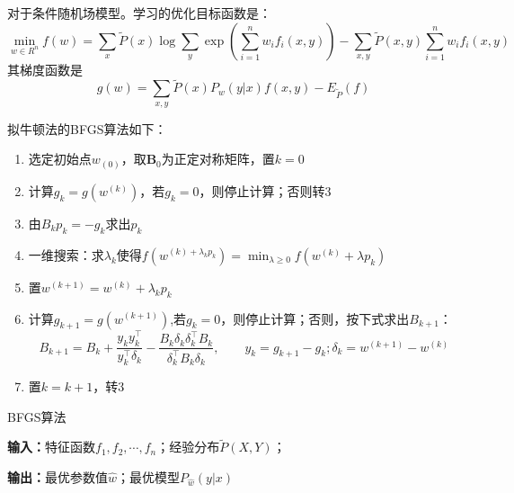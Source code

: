 \documentclass[a4paper,UTF8,no-math]{ctexart}
\begin{document}
	    对于条件随机场模型。学习的优化目标函数是：\begin{equation}
	    	\min_{w\in R^{n}} f(w)=\sum_{x}\tilde{P}(x)\log \sum_{y}\exp\left(\sum_{i=1}^{n}w_{i}f_{i}\left(x,y\right)\right)-\sum_{x,y}\tilde{P}(x,y)\sum_{i=1}^{n}w_{i}f_{i}\left(x,y\right) 
	    \end{equation}其梯度函数是\begin{equation}
	    	g(w)=\sum_{x,y}\tilde{P}(x)P_{w}(y|x)f(x,y)-E_{\tilde{P}}(f)
	    \end{equation}
	    
	    拟牛顿法的BFGS算法如下：
	    
	    
	    \begin{enumerate}
	    	\item 选定初始点$ w_{(0)} $，取$ \mathbf{B}_{0} $为正定对称矩阵，置$ k=0 $
	    	\item 计算$ g_{k}=g(w^{(k)}) $，若$ g_{k}=0 $，则停止计算；否则转3
	    	\item 由$ B_{k}p_{k}=-g_{k} $求出$ p_{k} $
	    	\item 一维搜索：求$\lambda_{k}$使得$f(w^{(k)+\lambda_{k}p_{k}})=\min_{\lambda \ge 0}f\left(w^{(k)}+\lambda p_{k}\right)$
	    	\item 置$ w^{(k+1)} = w^{(k)}+\lambda_{k}p_{k}$
	    	\item 计算$ g_{k+1}=g(w^{(k+1)}) $,若$ g_{k}=0 $，则停止计算；否则，按下式求出$ B_{k+1} $：\[B_{k+1}=B_{k}+\frac{y_{k}y_{k}^{\top}}{y_{k}^{\top}\delta_{k}}-\frac{B_{k}\delta_{k}\delta_{k}^{\top}B_{k}}{\delta_{k}^{\top}B_{k}\delta_{k}},\qquad y_{k}=g_{k+1}-g_{k};\delta_{k}=w^{(k+1)}-w^{(k)}\]
	    	\item 置$ k=k+1 $，转3
	    \end{enumerate}
	    
	    \begin{algorithm}[htb]
	    	\caption{BFGS算法}
	    	\label{alg:viterbi}
	    	{\bf 输入：}特征函数$ f_{1},f_{2},\cdots,f_{n} $；经验分布$ \tilde{P}(X,Y) $；
	    	
	    	
	    	{\bf 输出：}最优参数值$ \hat{w} $；最优模型$ P_{\hat{w}}(y|x) $
	    	
	    	\begin{algorithmic}[1] 
	    	\end{algorithmic} 
	    	
	    \end{algorithm}
\end{document}
